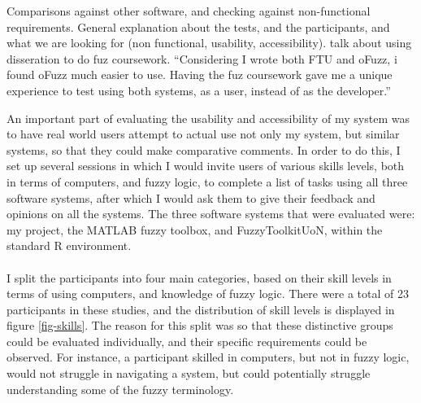 	{\color{red}
		Comparisons against other software, and checking against non-functional requirements. General explanation about the tests, and the participants, and what we are looking for (non functional, usability, accessibility). talk about using disseration to do fuz coursework. ``Considering I wrote both FTU and oFuzz, i found oFuzz much easier to use. Having the fuz coursework gave me a unique experience to test using both systems, as a user, instead of as the developer.''
		
		{\color{blue}
		An important part of evaluating the usability and accessibility of my system was to have real world users attempt to actual use not only my system, but similar systems, so that they could make comparative comments. In order to do this, I set up several sessions in which I would invite users of various skills levels, both in terms of computers, and fuzzy logic, to complete a list of tasks using all three software systems, after which I would ask them to give their feedback and opinions on all the systems. The three software systems that were evaluated were: my project, the MATLAB fuzzy toolbox, and FuzzyToolkitUoN, within the standard R environment.\ \\
		\ \\
		I split the participants into four main categories, based on their skill levels in terms of using computers, and knowledge of fuzzy logic. There were a total of 23 participants in these studies, and the distribution of skill levels is displayed in figure \ref{fig-skills}. The reason for this split was so that these distinctive groups could be evaluated individually, and their specific requirements could be observed. For instance, a participant skilled in computers, but not in fuzzy logic, would not struggle in navigating a system, but could potentially struggle understanding some of the fuzzy terminology.
		
}}
